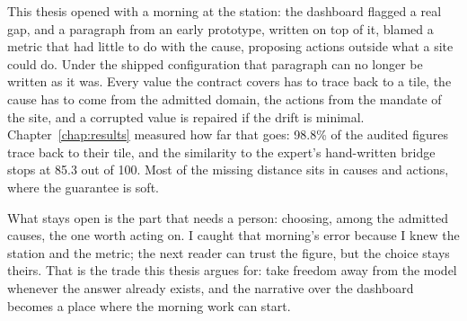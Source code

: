 \documentclass[12pt,a4paper,openright,twoside]{book}
\begin{document}
This thesis opened with a morning at the station: the dashboard flagged a real gap, and a paragraph from an early prototype, written on top of it, blamed a metric that had little to do with the cause, proposing actions outside what a site could do.
Under the shipped configuration that paragraph can no longer be written as it was.
Every value the contract covers has to trace back to a tile, the cause has to come from the admitted domain, the actions from the mandate of the site, and a corrupted value is repaired if the drift is minimal.
Chapter~\ref{chap:results} measured how far that goes: 98.8\% of the audited figures trace back to their tile, and the similarity to the expert's hand-written bridge stops at 85.3 out of 100.
Most of the missing distance sits in causes and actions, where the guarantee is soft.

What stays open is the part that needs a person: choosing, among the admitted causes, the one worth acting on.
I caught that morning's error because I knew the station and the metric; the next reader can trust the figure, but the choice stays theirs.
That is the trade this thesis argues for: take freedom away from the model whenever the answer already exists, and the narrative over the dashboard becomes a place where the morning work can start.


\backmatter





\end{document}
